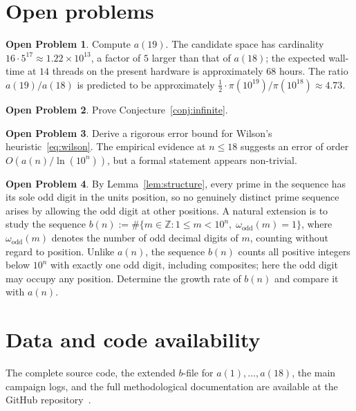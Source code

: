 \documentclass[11pt,a4paper]{article}
\theoremstyle{definition}
\newtheorem{openproblem}{Open Problem}
\begin{document}
\section{Open problems}\label{sec:open}

\begin{openproblem}\label{op:a19}
Compute $a(19)$. The candidate space has cardinality $16 \cdot 5^{17}
\approx 1.22\times 10^{13}$, a factor of $5$ larger than that of $a(18)$;
the expected wall-time at $14$ threads on the present hardware is
approximately $68$ hours. The ratio $a(19)/a(18)$ is predicted to be
approximately $\tfrac{1}{2} \cdot \pi(10^{19})/\pi(10^{18}) \approx 4.73$.
\end{openproblem}

\begin{openproblem}\label{op:proof}
Prove Conjecture~\ref{conj:infinite}.
\end{openproblem}

\begin{openproblem}\label{op:wilson}
Derive a rigorous error bound for Wilson's heuristic~\eqref{eq:wilson}.
The empirical evidence at $n \leq 18$ suggests an error of order
$O(a(n)/\ln(10^n))$, but a formal statement appears non-trivial.
\end{openproblem}

\begin{openproblem}\label{op:digits}
By Lemma~\ref{lem:structure}, every prime in the sequence has its sole odd
digit in the units position, so no genuinely distinct prime sequence arises
by allowing the odd digit at other positions. A natural extension is to
study the sequence $b(n) := \#\{m \in \mathbb{Z} : 1 \le m < 10^n,\;
\omega_{\mathrm{odd}}(m)=1\}$, where $\omega_{\mathrm{odd}}(m)$ denotes
the number of odd decimal digits of $m$, counting without regard to
position. Unlike $a(n)$, the sequence $b(n)$ counts all positive integers
below $10^n$ with exactly one odd digit, including composites; here the odd
digit may occupy any position. Determine the growth rate of $b(n)$ and
compare it with $a(n)$.
\end{openproblem}

\section{Data and code availability}\label{sec:data}

The complete source code, the extended $b$-file for $a(1), \ldots, a(18)$,
the main campaign logs, and the full methodological documentation are available
at the GitHub repository~\cite{Repo}.
\end{document}

